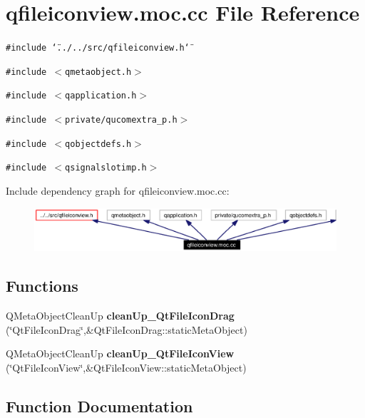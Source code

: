 \section{qfileiconview.moc.cc File Reference}
\label{qfileiconview_8moc_8cc}


{\tt \#include \char`\"{}../../src/qfileiconview.h\char`\"{}}\par
{\tt \#include $<$qmetaobject.h$>$}\par
{\tt \#include $<$qapplication.h$>$}\par
{\tt \#include $<$private/qucomextra\_\-p.h$>$}\par
{\tt \#include $<$qobjectdefs.h$>$}\par
{\tt \#include $<$qsignalslotimp.h$>$}\par


Include dependency graph for qfileiconview.moc.cc:\begin{figure}[H]
\begin{center}
\leavevmode
\includegraphics[width=341pt]{qfileiconview_8moc_8cc__incl}
\end{center}
\end{figure}
\subsection*{Functions}
\begin{CompactItemize}
\item 
QMeta\-Object\-Clean\-Up {\bf clean\-Up\_\-Qt\-File\-Icon\-Drag} (\char`\"{}Qt\-File\-Icon\-Drag\char`\"{},\&Qt\-File\-Icon\-Drag::static\-Meta\-Object)
\item 
QMeta\-Object\-Clean\-Up {\bf clean\-Up\_\-Qt\-File\-Icon\-View} (\char`\"{}Qt\-File\-Icon\-View\char`\"{},\&Qt\-File\-Icon\-View::static\-Meta\-Object)
\end{CompactItemize}


\subsection{Function Documentation}
